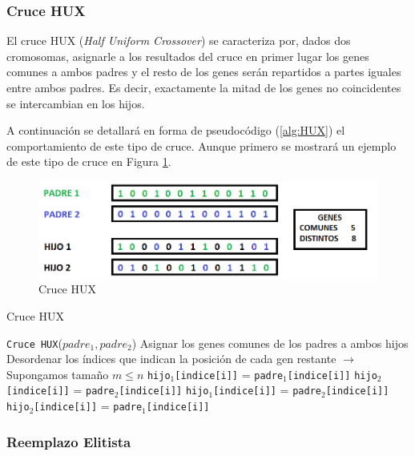\subsubsection{Cruce HUX}

El cruce HUX (\textit{Half Uniform Crossover}) se caracteriza por, dados dos cromosomas, asignarle a los resultados del cruce en primer lugar los genes comunes a ambos padres y el resto de los genes serán repartidos a partes iguales entre ambos padres. 
Es decir, exactamente la mitad de los genes no coincidentes se intercambian en los hijos. 

A continuación se detallará en forma de pseudocódigo (\ref{alg:HUX}) el comportamiento de este tipo de cruce. 
Aunque primero se mostrará un ejemplo de este tipo de cruce en Figura \ref{fig:HUX}.

\begin{figure}[h]
		\centering
		\includegraphics[scale=0.5]{imagenes/CrossoverHUX.png}
        \caption{Cruce HUX}
        \label{fig:HUX}
\end{figure}

\begin{algorithm}[h]
\caption{Cruce HUX}\label{alg:HUX}
\begin{algorithmic}[1]
\Procedure \texttt{Cruce HUX}($padre_1, padre_2$)
\State Asignar los genes comunes de los padres a ambos hijos
\State Desordenar los índices que indican la posición de cada gen restante $\xrightarrow{}{}$ Supongamos tamaño $m \leq n$
		\State \texttt{hijo$_1$[indice[i]]} = \texttt{padre$_1$[indice[i]]}
		\State \texttt{hijo$_2$[indice[i]]} = \texttt{padre$_2$[indice[i]]}
	\Else
		\State \texttt{hijo$_1$[indice[i]]} = \texttt{padre$_2$[indice[i]]}
		\State \texttt{hijo$_2$[indice[i]]} = \texttt{padre$_1$[indice[i]]}
	\EndIf
\EndFor
\EndProcedure
\end{algorithmic}
\end{algorithm}

\subsubsection{Reemplazo Elitista}


